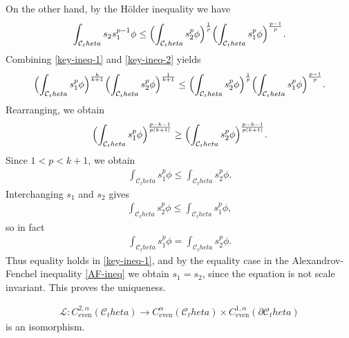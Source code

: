 \documentclass[12pt]{amsart}
\def\theta{theta}%
\numberwithin{equation}{section}
\newcommand{\8}{\infty}
\newcommand{\cC}{\mathcal{C}}
\newcommand{\cL}{\mathcal{L}}
\newcommand{\eq}[1]{\begin{equation}\begin{alignedat}{2}#1\end{alignedat}\end{equation}}
\newcommand{\Cth}{\cC_\theta}
\begin{document}
On the other hand, by the H\"older inequality we have
\eq{\label{key-ineq-2}
\int_{\cC_\theta} s_2 s_1^{p-1}\phi
  \le \Bigl(\int_{\cC_\theta} s_2^p \phi\Bigr)^{\frac{1}{p}}
       \Bigl(\int_{\cC_\theta} s_1^p \phi\Bigr)^{\frac{p-1}{p}}.
}
Combining \eqref{key-ineq-1} and \eqref{key-ineq-2} yields
\eq{
\Bigl(\int_{\cC_\theta} s_1^p \phi\Bigr)^{\frac{k}{k+1}}
\Bigl(\int_{\cC_\theta} s_2^p \phi\Bigr)^{\frac{1}{k+1}}
  \le
\Bigl(\int_{\cC_\theta} s_2^p \phi\Bigr)^{\frac{1}{p}}
\Bigl(\int_{\cC_\theta} s_1^p \phi\Bigr)^{\frac{p-1}{p}}.
}
Rearranging, we obtain
\eq{
\Bigl(\int_{\cC_\theta} s_1^p \phi\Bigr)^{\frac{p-k-1}{p(k+1)}}
  \ge
\Bigl(\int_{\cC_\theta} s_2^p \phi\Bigr)^{\frac{p-k-1}{p(k+1)}}.
}
Since $1<p<k+1$, we obtain
\eq{
\int_{\cC_\theta} s_1^p \phi \le \int_{\cC_\theta} s_2^p \phi.
}
Interchanging $s_1$ and $s_2$ gives
\eq{
\int_{\cC_\theta} s_2^p \phi \le \int_{\cC_\theta} s_1^p \phi,
}
so in fact
\eq{
\int_{\cC_\theta} s_1^p \phi = \int_{\cC_\theta} s_2^p \phi.
}
Thus equality holds in \eqref{key-ineq-1}, and by the equality case in the Alexandrov-Fenchel inequality \eqref{AF-ineq} we obtain $s_1=s_2$, since the equation is not scale invariant. This proves the uniqueness.

\begin{lemma}\label{lem:L1-iso}
\eq{
  \cL:C^{2,\alpha}_{\mathrm{even}}(\Cth)\to C^{\alpha}_{\mathrm{even}}(\Cth)\times C^{1,\alpha}_{\mathrm{even}}(\partial\Cth)
}
is an isomorphism.
\end{lemma}
\end{document}
